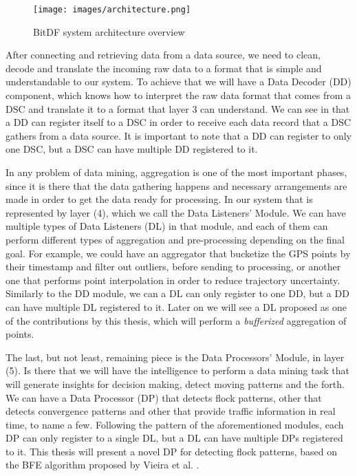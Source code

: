 \begin{figure}[h!]
    \centering
    \texttt{[image: images/architecture.png]}
    \caption{BitDF system architecture overview}
    \label{fig:architecture}
\end{figure}

After connecting and retrieving data from a data source, we need to clean, decode and translate the incoming raw data to
a format that is simple and understandable to our system. To achieve that we will have a Data Decoder (DD) component,
which knows how to interpret the raw data format that comes from a DSC and translate it to a format that layer 3 can
understand. We can see in  that a DD can register itself to a DSC in order to receive each data
record that a DSC gathers from a data source. It is important to note that a DD can register to only one DSC, but a DSC
can have multiple DD registered to it.

In any problem of data mining, aggregation is one of the most important phases, since it is there that the data
gathering happens and necessary arrangements are made in order to get the data ready for processing. In our system that
is represented by layer (4), which we call the Data Listeners' Module. We can have multiple types of Data Listeners (DL)
in that module, and each of them can perform different types of aggregation and pre-processing depending on the final
goal.  For example, we could have an aggregator that bucketize the GPS points by their timestamp and filter out
outliers, before sending to processing, or another one that performs point interpolation in order to reduce trajectory
uncertainty. Similarly to the DD module, we can a DL can only register to one DD, but a DD can have multiple DL
registered to it. Later on we will see a DL proposed as one of the contributions by this thesis, which will perform a
\textit{bufferized} aggregation of points.

The last, but not least, remaining piece is the Data Processors' Module, in layer (5). Is there that we will have the
intelligence to perform a data mining task that will generate insights for decision making, detect moving patterns and
the forth. We can have a Data Processor (DP) that detects flock patterns, other that detects convergence patterns and
other that provide traffic information in real time, to name a few. Following the pattern of the aforementioned modules,
each DP can only register to a single DL, but a DL can have multiple DPs registered to it. This thesis will present a
novel DP for detecting flock patterns, based on the BFE algorithm proposed by Vieira et al. \citep{vieira}.

